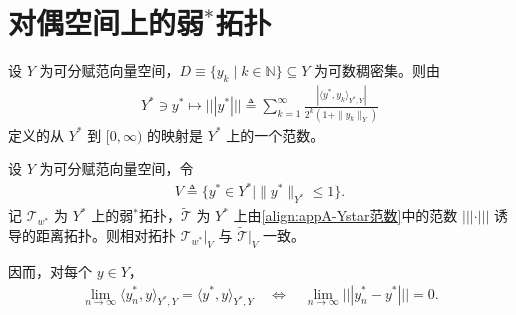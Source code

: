 \documentclass[../main.tex]{subfiles}
\begin{document}
\section{对偶空间上的弱$^*$拓扑}\label{section:appA-对偶弱星}

\begin{lemma}\label{lemma:appA-Ystar范数}
设 $Y$ 为可分赋范向量空间，$D\equiv\{y_k\mid k\in\mathbb{N}\}\subseteq Y$ 为可数稠密集。则由
\begin{align}
Y^*\ni y^*\mapsto |||y^*|||\triangleq \sum_{k=1}^\infty\frac{|\langle y^*,y_k\rangle_{Y^*,Y}|}{2^k(1+\|y_k\|_Y)} \label{align:appA-Ystar范数}
\end{align}
定义的从 $Y^*$ 到 $[0,\infty)$ 的映射是 $Y^*$ 上的一个范数。
\end{lemma}

\begin{proposition}\label{proposition:appA-弱星拓扑}\label{proposition:appA-弱星可度量化}
设 $Y$ 为可分赋范向量空间，令
\begin{align}
V\triangleq \{y^*\in Y^*\mid\|y^*\|_{Y^*}\leqslant 1\}. \label{align:appA-V单位球}
\end{align}
记 $\mathscr{T}_{w^*}$ 为 $Y^*$ 上的弱$^*$拓扑，$\widetilde{\mathscr{T}}$ 为 $Y^*$ 上由\eqref{align:appA-Ystar范数}中的范数 $|||\cdot|||$ 诱导的距离拓扑。则相对拓扑 $\mathscr{T}_{w^*}|_V$ 与 $\widetilde{\mathscr{T}}|_V$ 一致。

因而，对每个 $y\in Y$，
\begin{align*}
\lim_{n\to\infty}\langle y_n^*,y\rangle_{Y^*,Y}=\langle y^*,y\rangle_{Y^*,Y}
\quad\Longleftrightarrow\quad
\lim_{n\to\infty}|||y_n^*-y^*|||=0.
\end{align*}
\end{proposition}
\end{document}
